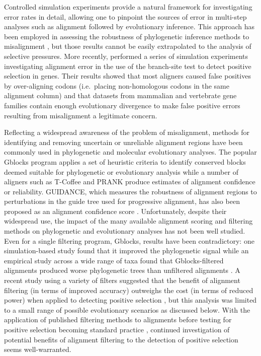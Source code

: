 Controlled simulation experiments provide a natural framework for
investigating error rates in detail, allowing one to pinpoint the
sources of error in multi-step analyses such as alignment followed by
evolutionary inference. This approach has been employed in assessing
the robustness of phylogenetic inference methods to misalignment
\citep{Dwivedi2009Phylogenetic,Ogden2006Multiple,Loytynoja2008PhylogenyAware},
but those results cannot be easily extrapolated to the analysis of \sw
selective pressures. More recently, \citet{Fletcher2010} performed a
series of simulation experiments investigating alignment error in the
use of the branch-site test to detect positive selection in
genes. Their results showed that most aligners caused false positives
by over-aligning codons (i.e.\ placing non-homologous codons in the
same alignment column) and that datasets from mammalian and vertebrate
gene families contain enough evolutionary divergence to make false
positive errors resulting from misalignment a legitimate concern.

Reflecting a widespread awareness of the problem of misalignment,
methods for identifying and removing uncertain or unreliable alignment
regions have been commonly used in phylogenetic and molecular
evolutionary analyses. The popular Gblocks program applies a set of
heuristic criteria to identify conserved blocks deemed suitable for
phylogenetic or evolutionary analysis \citep{Castresana2000Selection}
while a number of aligners such as T-Coffee
\citep{Notredame2000} and PRANK
\citep{Loytynoja2008PhylogenyAware} produce estimates of alignment
confidence or reliability. GUIDANCE, which measures the robustness of
alignment regions to perturbations in the guide tree used for
progressive alignment, has also been proposed as an alignment
confidence score \citep{Penn2010Alignment}. Unfortunately, despite
their widespread use, the impact of the many available alignment
scoring and filtering methods on phylogenetic and evolutionary
analyses has not been well studied. Even for a single filtering
program, Gblocks, results have been contradictory: one
simulation-based study found that it improved the phylogenetic signal
\citep{Talavera2007Improvement} while an empirical study across a wide
range of taxa found that Gblocks-filtered alignments produced worse
phylogenetic trees than unfiltered alignments
\citep{Dessimoz2010Phylogenetic}. A recent study using a variety of
filters suggested that the benefit of alignment filtering (in terms of
improved accuracy) outweighs the cost (in terms of reduced power) when
applied to detecting positive selection \citep{Privman2011Improving},
but this analysis was limited to a small range of possible
evolutionary scenarios as discussed below.  With the application of
published filtering methods to alignments before testing for positive
selection becoming standard practice
\citep{Studer2008,Aguileta2009Rapidly}, continued
investigation of potential benefits of alignment filtering to the
detection of positive selection seems well-warranted.

